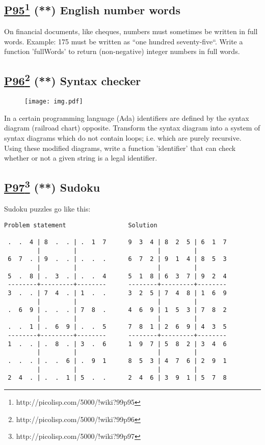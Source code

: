 \documentclass[10pt,a4paper]{article}
\begin{document}
\subsection*{\underline{P95}\footnote{http://picolisp.com/5000/!wiki?99p95} (**) English number words}
On financial documents, like cheques, numbers must sometimes be written in full
words. Example: 175 must be written as ``one hundred seventy-five``. Write a
function 'fullWords' to return (non-negative) integer numbers in full words.

\subsection*{\underline{P96}\footnote{http://picolisp.com/5000/!wiki?99p96} (**) Syntax checker}

\begin{figure}[h]
\begin{flushleft}
\texttt{[image: img.pdf]}
\end{flushleft}
\end{figure}


In a certain programming language (Ada) identifiers are defined
by the syntax diagram (railroad chart) opposite.
Transform the syntax diagram into a system of syntax diagrams
which do not contain loops; i.e. which are purely recursive.
Using these modified diagrams, write a function 'identifier' that can
check whether or not a given string is a legal identifier.

\subsection*{\underline{P97}\footnote{http://picolisp.com/5000/!wiki?99p97} (**) Sudoku}
Sudoku puzzles go like this:
\begin{verbatim}
Problem statement                 Solution

 .  .  4 | 8  .  . | .  1  7      9  3  4 | 8  2  5 | 6  1  7
         |         |                      |         |
 6  7  . | 9  .  . | .  .  .      6  7  2 | 9  1  4 | 8  5  3
         |         |                      |         |
 5  .  8 | .  3  . | .  .  4      5  1  8 | 6  3  7 | 9  2  4
 --------+---------+--------      --------+---------+--------
 3  .  . | 7  4  . | 1  .  .      3  2  5 | 7  4  8 | 1  6  9
         |         |                      |         |
 .  6  9 | .  .  . | 7  8  .      4  6  9 | 1  5  3 | 7  8  2
         |         |                      |         |
 .  .  1 | .  6  9 | .  .  5      7  8  1 | 2  6  9 | 4  3  5
 --------+---------+--------      --------+---------+--------
 1  .  . | .  8  . | 3  .  6      1  9  7 | 5  8  2 | 3  4  6
         |         |                      |         |
 .  .  . | .  .  6 | .  9  1      8  5  3 | 4  7  6 | 2  9  1
         |         |                      |         |
 2  4  . | .  .  1 | 5  .  .      2  4  6 | 3  9  1 | 5  7  8
\end{verbatim}
\end{document}
